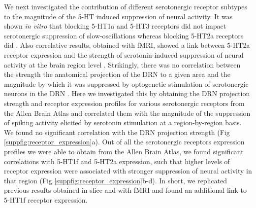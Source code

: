 \documentclass[11pt,a4paper,onecolumn]{article}
\begin{document}
We next investigated the contribution of different serotonergic receptor subtypes to the magnitude of the 5-HT induced suppression of neural activity. It was shown \emph{in vitro} that blocking 5-HT1a and 5-HT3 receptors did not impact serotonergic suppression of slow-oscillations whereas blocking 5-HT2a receptors did \citep{defilippoSomatostatinInterneuronsActivated2021}. Also correlative results, obtained with fMRI, showed a link between 5-HT2a receptor expression and the strength of serotonin-induced suppression of neural activity at the brain region level \citep{grandjeanBrainwideFunctionalMap2019}. Strikingly, there was no correlation between the strength the anatomical projection of the DRN to a given area and the magnitude by which it was suppressed by optogenetic stimulation of serotonergic neurons in the DRN \citep{grandjeanBrainwideFunctionalMap2019}. Here we investigated this by obtaining the DRN projection strength and receptor expression profiles for various serotonergic receptors from the Allen Brain Atlas and correlated them with the magnitude of the suppression of spiking activity elicited by serotonin stimulation at a region-by-region basis. We found no significant correlation with the DRN projection strength (Fig \ref{suppfig:receptor_expression}a). Out of all the serotonergic receptors expression profiles we were able to obtain from the Allen Brain Atlas, we found significant correlations with 5-HT1f and 5-HT2a expression, such that higher levels of receptor expression were associated with stronger suppression of neural activity in that region (Fig \ref{suppfig:receptor_expression}b-d). In short, we replicated previous results obtained in slice and with fMRI and found an additional link to 5-HT1f receptor expression.
\end{document}
